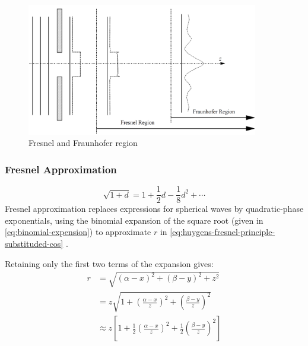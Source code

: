 \begin{figure}[H]
  \centering
  \includegraphics[width=0.9\textwidth]{fresnel_fraunhofer_approximations.png}
  \caption{Fresnel and Fraunhofer region \cite{Wilkinson2019}}\label{fig:fresnel_fraunhofer_approximations}
\end{figure}


\subsubsection{Fresnel Approximation}
\begin{equation}
  \sqrt{1+d} = 1 + \frac{1}{2}d - \frac{1}{8}d^2 + \cdots \label{eq:binomial-expension}
\end{equation}
Fresnel approximation replaces expressions for spherical waves by quadratic-phase exponentials, using the binomial expansion of the square root (given in \cref{eq:binomial-expension}) to approximate $r$ in \cref{eq:huygens-fresnel-principle-substituded-cos} \cite{Goodman2017}.

Retaining only the first two terms of the expansion gives:
\begin{align}
  r & = \sqrt{(\alpha-x)^2 + (\beta-y)^2 + z^2}                                                                                                              \\
    & = z \sqrt{1 + \left( \frac{\alpha-x}{z} \right)^2 + \left(\frac{\beta-y}{z}\right)^2}                                                                  \\
    & \approx z \left[ 1 + \frac{1}{2} \left( \frac{\alpha-x}{z} \right)^2 + \frac{1}{2} \left(\frac{\beta-y}{z}\right)^2 \right] \label{eq:r-approximation}
\end{align}

